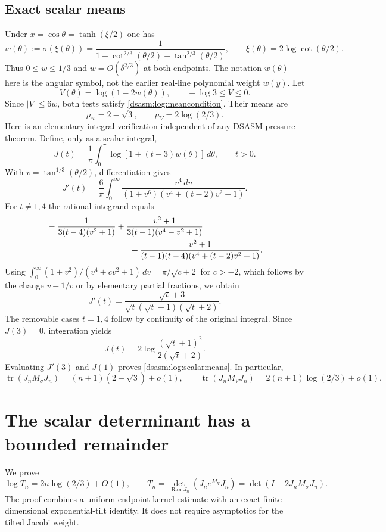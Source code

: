 \documentclass[11pt,letterpaper]{article}
\theoremstyle{remark}\newtheorem{remark}[theorem]{Remark}
\DeclareMathOperator{\tr}{tr}\DeclareMathOperator{\Ran}{Ran}
\begin{document}
\subsection{Exact scalar means}
Under $x=\cos\theta=\tanh(\xi/2)$ one has
\begin{equation}\label{dsasm:log:angularsymbol}
 w(\theta):=\sigma(\xi(\theta))
 =\frac1{1+\cot^{2/3}(\theta/2)+\tan^{2/3}(\theta/2)},
 \qquad \xi(\theta)=2\log\cot(\theta/2).
\end{equation}
Thus $0\le w\le1/3$ and $w=O(\delta^{2/3})$ at both endpoints.
The notation $w(\theta)$ here is the angular symbol, not the earlier
real-line polynomial weight $w(y)$. Let
\[
 V(\theta)=\log(1-2w(\theta)),\qquad -\log3\le V\le0.
\]
Since $|V|\le6w$, both tests satisfy \eqref{dsasm:log:meancondition}.
Their means are
\begin{equation}\label{dsasm:log:scalarmeans}
 \mu_w=2-\sqrt3,\qquad \mu_V=2\log(2/3).
\end{equation}
Here is an elementary integral verification independent of any DSASM
pressure theorem. Define, only as a scalar integral,
\[
 J(t)=\frac1\pi\int_0^\pi\log[1+(t-3)w(\theta)]\,d\theta,
 \qquad t>0.
\]
With $v=\tan^{1/3}(\theta/2)$, differentiation gives
\[
 J'(t)=\frac6\pi\int_0^\infty
 \frac{v^4\,dv}{(1+v^6)(v^4+(t-2)v^2+1)}.
\]
For $t\ne1,4$ the rational integrand equals
\begin{align*}
 &-\frac1{3(t-4)(v^2+1)}
 +\frac{v^2+1}{3(t-1)(v^4-v^2+1)}\\
 &\hspace{35mm}
 +\frac{v^2+1}{(t-1)(t-4)(v^4+(t-2)v^2+1)}.
\end{align*}
Using $\int_0^\infty (1+v^2)/(v^4+cv^2+1)\,dv
=\pi/\sqrt{c+2}$ for $c>-2$, which follows by the change
$v-1/v$ or by elementary partial fractions, we obtain
\[
 J'(t)=\frac{\sqrt t+3}{\sqrt t(\sqrt t+1)(\sqrt t+2)}.
\]
The removable cases $t=1,4$ follow by continuity of the original
integral. Since $J(3)=0$, integration yields
\begin{equation}\label{dsasm:log:Jintegral}
 J(t)=2\log\frac{(\sqrt t+1)^2}{2(\sqrt t+2)}.
\end{equation}
Evaluating $J'(3)$ and $J(1)$ proves \eqref{dsasm:log:scalarmeans}. In particular,
\begin{equation}\label{dsasm:log:appliedmean}
 \tr(J_nM_\sigma J_n)=(n+1)(2-\sqrt3)+o(1),\qquad
 \tr(J_nM_VJ_n)=2(n+1)\log(2/3)+o(1).
\end{equation}

\section{The scalar determinant has a bounded remainder}
\label{dsasm:log:sec:scalar}
We prove
\begin{equation}\label{dsasm:log:scalarresult}
 \log T_n=2n\log(2/3)+O(1),\qquad
 T_n=\det_{\Ran J_n}(J_ne^{M_V}J_n)
     =\det(I-2J_nM_\sigma J_n).
\end{equation}
The proof combines a uniform endpoint kernel estimate with an exact
finite-dimensional exponential-tilt identity. It does not require
asymptotics for the tilted Jacobi weight.
\end{document}
